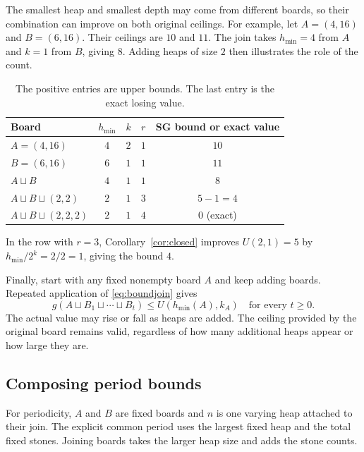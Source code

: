 \documentclass[11pt]{article}
\newcommand{\join}{\sqcup}
\begin{document}
The smallest heap and smallest depth may come from different boards,
so their combination can improve on both original ceilings. For
example, let $A=(4,16)$ and $B=(6,16)$. Their ceilings are $10$ and
$11$. The join takes $h_{\min}=4$ from $A$ and $k=1$ from $B$, giving $8$.
Adding heaps of size $2$ then illustrates the role of the count.

\begin{table}[H]
\centering\small
\begin{tabular}{@{}lcccc@{}}
\toprule
Board & $h_{\min}$ & $k$ & $r$ & SG bound or exact value\\
\midrule
$A=(4,16)$ & $4$ & $2$ & $1$ & $10$\\
$B=(6,16)$ & $6$ & $1$ & $1$ & $11$\\
$A\join B$ & $4$ & $1$ & $1$ & $8$\\
$A\join B\join(2,2)$ & $2$ & $1$ & $3$ & $5-1=4$\\
$A\join B\join(2,2,2)$ & $2$ & $1$ & $4$ & $0$ (exact)\\
\bottomrule
\end{tabular}
\caption{The positive entries are upper bounds. The last entry is
the exact losing value.}
\label{tab:joinexample}
\end{table}

In the row with $r=3$, Corollary~\ref{cor:closed} improves
$U(2,1)=5$ by $h_{\min}/2^k=2/2=1$, giving the bound $4$.

Finally, start with any fixed nonempty board $A$ and keep adding
boards. Repeated application of \eqref{eq:boundjoin} gives
\begin{equation}
 \boxed{g(A\join B_1\join\cdots\join B_t)\le U(h_{\min}(A),k_A)
 \quad\text{for every }t\ge0.}
 \label{eq:forever}
\end{equation}
The actual value may rise or fall as heaps are added. The ceiling
provided by the original board remains valid, regardless of how
many additional heaps appear or how large they are.

\subsection{Composing period bounds}

For periodicity, $A$ and $B$ are fixed boards and $n$ is one
varying heap attached to their join. The explicit common period
uses the largest fixed heap and the total fixed stones. Joining
boards takes the larger heap size and adds the stone counts.
\end{document}

